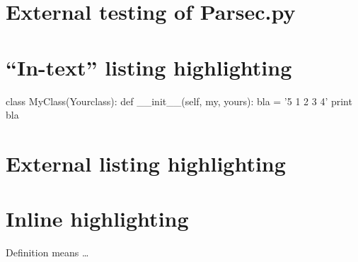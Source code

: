 \section{External testing of Parsec.py}


\section{``In-text'' listing highlighting}

\begin{python}
class MyClass(Yourclass):
  def __init__(self, my, yours):
      bla = '5 1 2 3 4'
      print bla
\end{python}

\section{External listing highlighting}


\section{Inline highlighting}

Definition  means \dots
